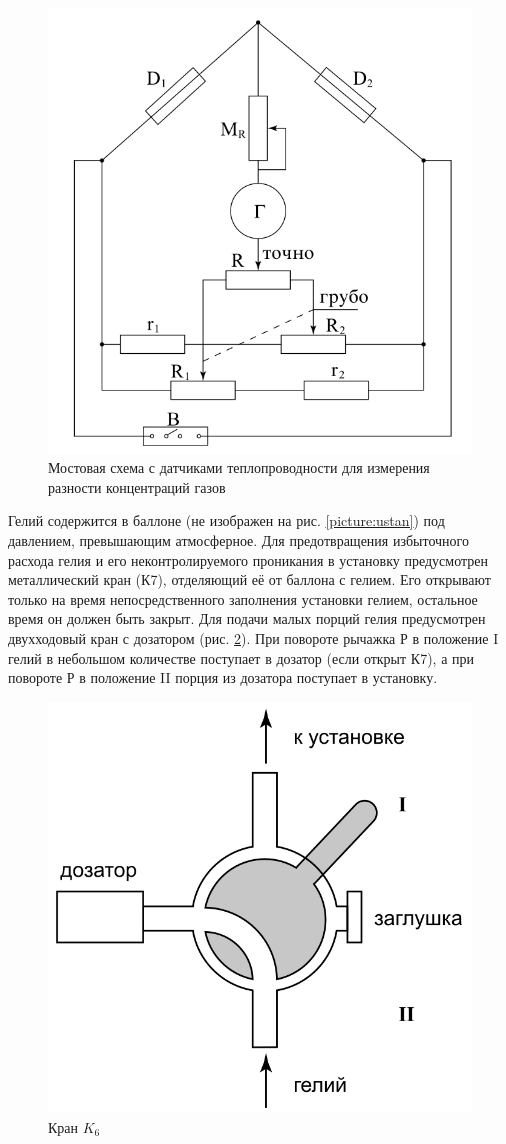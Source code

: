 \documentclass[a4paper,12pt]{article}
\begin{document}
\begin{figure}[!h]
    \centering
    \includegraphics[width=7.5 cm]{scheme.png}
    \caption{Мостовая схема с датчиками теплопроводности для измерения разности концентраций газов}
    \label{picture:scheme}
\end{figure} 

Гелий содержится в баллоне (не изображен на рис. \ref{picture:ustan}) под давлением, превышающим атмосферное. Для предотвращения избыточного расхода гелия и его неконтролируемого проникания в установку предусмотрен металлический кран (К7), отделяющий её от баллона с гелием. Его открывают только на время непосредственного заполнения установки гелием, остальное время он должен быть закрыт. Для подачи малых порций гелия предусмотрен двухходовый кран с дозатором (рис. \ref{picture:crane}). При повороте рычажка Р в положение I гелий в небольшом количестве поступает в дозатор (если открыт К7), а при повороте Р в положение II порция из дозатора поступает в установку.

\begin{figure}[!h]
    \centering
    \includegraphics[width=7.5 cm]{crane.png}
    \caption{Кран $K_6$}
    \label{picture:crane}
\end{figure}
\end{document}
